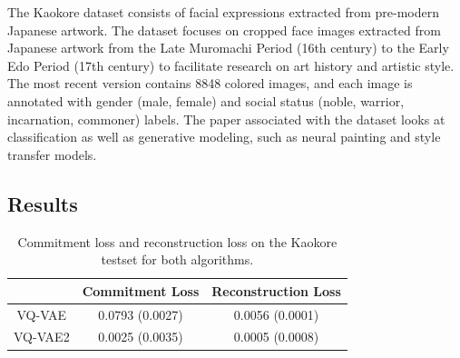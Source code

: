 \documentclass{article}
\begin{document}
The Kaokore dataset consists of facial expressions extracted from pre-modern Japanese artwork. The dataset focuses on cropped face images extracted from Japanese artwork from the Late Muromachi Period (16th century) to the Early Edo Period (17th century) to facilitate research on art history and artistic style. The most recent version contains 8848 colored images, and each image is annotated with gender (male, female) and social status (noble, warrior, incarnation, commoner) labels. The paper associated with the dataset looks at classification as well as generative modeling, such as neural painting and style transfer models. 

\subsection{Results}

\begin{table}[H]
    \centering
    \begin{tabular}{c c c}
        & Commitment Loss & Reconstruction Loss \\
        \hline
        VQ-VAE & 0.0793 (0.0027) & 0.0056 (0.0001) \\
        VQ-VAE2 & 0.0025 (0.0035) & 0.0005 (0.0008)
    \end{tabular}
    \caption{Commitment loss and reconstruction loss on the Kaokore testset for both algorithms.}
\end{table}
\end{document}

